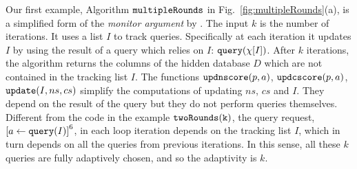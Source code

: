 %
Our first example, Algorithm $\mathtt{multipleRounds}$ in Fig.~\ref{fig:multipleRounds}(a), is a simplified form of the \emph{monitor argument} by \citet{RogersRSSTW20}.
The input $k$ is the number of iterations.
It uses a list $I$ to track queries. Specifically at each iteration it updates $I$ by using the result of a query which relies on $I$:  ${\tt query}(\chi[I])$.
After $k$ iterations, the algorithm returns the columns of the hidden database $D$ which are not contained in the  tracking list $I$.
The functions $\mathtt{updnscore}(p,a)$,
$\mathtt{updcscore}(p,a)$, $\mathtt{update}(I,ns,cs)$ simplify the computations of updating $ns$, $cs$ and $I$. They depend on the result of the query but they do not perform queries themselves. %
%
%
Different from the code in the example $\mathtt{twoRounds(k)}$,
the query request, $\clabel{\assign{a}{\query(I)}}^6$, in each loop iteration
depends on the tracking list $I$, which in turn depends on  all the queries from previous iterations. 
In this sense, all these $k$ queries are fully adaptively chosen, and so the adaptivity is $k$.
